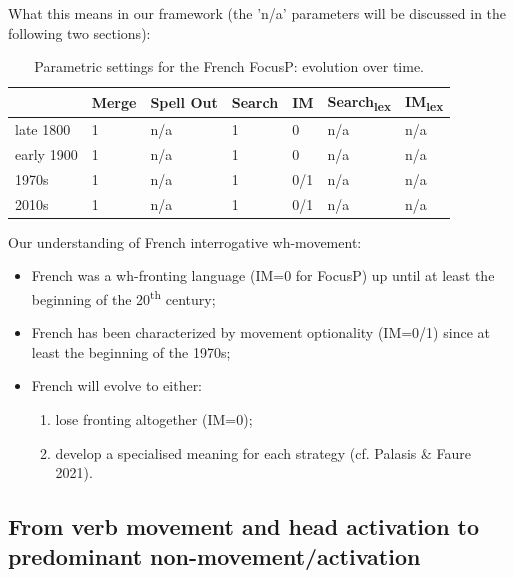\documentclass[fleqn,10pt]{wlscirep}
\begin{document}
\noindent What this means in our framework (the 'n/a' parameters will be discussed in the following two sections):

    \begin{table}[H]
        \centering
        \begin{tabular}{|l|l|l|l|l|l|l|}
        \hline
         & Merge & Spell Out & Search & IM & Search\textsubscript{lex} & IM\textsubscript{lex} \\
        \hline
        late 1800 & 1 & n/a & 1 & 0 & n/a & n/a \\
        \hline
        early 1900 & 1 & n/a & 1 & 0 & n/a & n/a \\
        \hline
        1970s & 1 & n/a & 1 & 0/1 & n/a & n/a \\
        \hline
        2010s & 1 & n/a & 1 & 0/1 & n/a & n/a \\
        \hline
        \end{tabular}
        \caption{\label{tab:samp}Parametric settings for the French FocusP: evolution over time.}
    \end{table}

\noindent Our understanding of French interrogative wh-movement:
    \begin{itemize}
        \item French was a wh-fronting language (IM=0 for FocusP) up until at least the beginning of the 20\textsuperscript{th} century;
        \item \vspace*{-4mm} French has been characterized by movement optionality (IM=0/1) since at least the beginning of the 1970s;
        \item \vspace*{-4mm} French will evolve to either:
        \begin{enumerate}
            \item \vspace*{-4mm} lose fronting altogether (IM=0);
            \item \vspace*{-4mm} develop a specialised meaning for each strategy (cf. Palasis \& Faure 2021).
        \end{enumerate}    
    \end{itemize}

\subsection*{From verb movement and head activation to predominant non-movement/activation}
\end{document}
